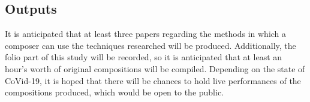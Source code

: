 \subsection{Outputs}
It is anticipated that at least three papers regarding the methods in which a composer can use the techniques researched will be produced. 
Additionally, the folio part of this study will be recorded, so it is anticipated that at least an hour's worth of original compositions will be compiled.
Depending on the state of CoVid-19, it is hoped that there will be chances to hold live performances of the compositions produced, which would be open to the public.